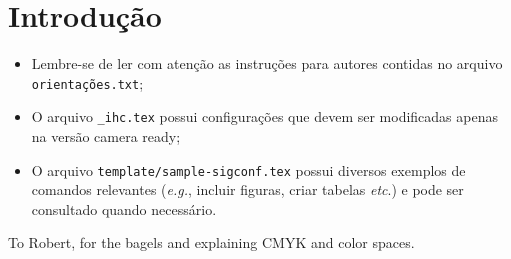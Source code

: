 \documentclass[sigconf,anonymous]{acmart}
\begin{document}
\section{Introdução}

\begin{itemize}
    \item Lembre-se de ler com atenção as instruções para autores contidas no arquivo \texttt{orientações.txt};
    \item O arquivo \texttt{\_ihc.tex} possui configurações que devem ser modificadas apenas na versão camera ready;
    \item O arquivo \texttt{template/sample-sigconf.tex} possui diversos exemplos de comandos relevantes (\textit{e.g.}, incluir figuras, criar tabelas \textit{etc}.) e pode ser consultado quando necessário.
\end{itemize}

\lipsum[1-4]


\begin{acks}
To Robert, for the bagels and explaining CMYK and color spaces.
\end{acks}



\end{document}
